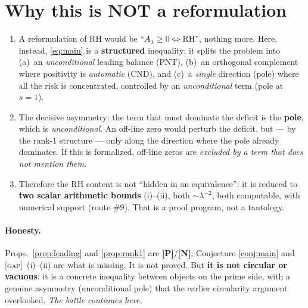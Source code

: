 \documentclass[11pt]{article}
\newcommand{\PR}{\textcolor{green!55!black}{\textbf{[P]}}}
\newcommand{\NM}{\textcolor{blue!70!black}{\textbf{[N]}}}
\newcommand{\GAP}{\textcolor{red!75!black}{\textsc{[gap]}}}
\theoremstyle{plain}
\theoremstyle{definition}
\begin{document}
\section{Why this is NOT a reformulation}\label{sec:notrefo}

\begin{enumerate}[leftmargin=1.6em]
\item A reformulation of RH would be ``$A_\lambda\ge0\Leftrightarrow$RH'', nothing
more. Here, instead, \eqref{eq:main} is a \textbf{structured} inequality: it splits
the problem into (a)~an \emph{unconditional} leading balance (PNT), (b)~an orthogonal
complement where positivity is \emph{automatic} (CND), and (c)~a \emph{single}
direction (pole) where all the risk is concentrated, controlled by an
\emph{unconditional} term (pole at $s=1$).
\item The decisive asymmetry: the term that must dominate the deficit is the
\textbf{pole}, which is \emph{unconditional}. An off-line zero would perturb the
deficit, but --- by the rank-$1$ structure --- only along the direction
where the pole already dominates. If this is formalized, off-line zeros are
\emph{excluded by a term that does not mention them}.
\item Therefore the RH content is not ``hidden in an equivalence'': it is
reduced to \textbf{two scalar arithmetic bounds} (i)--(ii), both $\sim\lambda^{-2}$,
both computable, with numerical support (route \#9). That is a proof program,
not a tautology.
\end{enumerate}

\paragraph{Honesty.} Props.\ \ref{prop:leading} and \ref{prop:rank1} are \PR/\NM;
Conjecture \ref{conj:main} and \GAP\ (i)--(ii) are what is missing. It is not proved.
But \textbf{it is not circular or vacuous}: it is a concrete inequality between
objects on the prime side, with a genuine asymmetry (unconditional pole) that the
earlier circularity argument overlooked. \emph{The battle continues here.}
\end{document}
